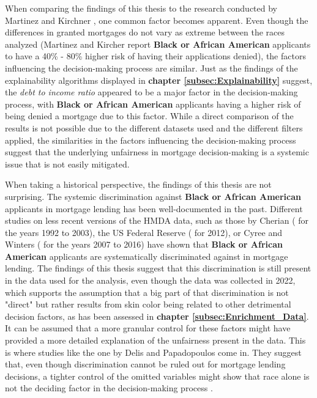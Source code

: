 When comparing the findings of this thesis to the research conducted by Martinez and Kirchner \parencite{Martinez2021}, one common factor becomes apparent. Even though the differences in granted mortgages do not vary as extreme between the races analyzed (Martinez and Kircher report \textbf{Black or African American} applicants to have a 40\% - 80\% higher risk of having their applications denied), the factors influencing the decision-making process are similar.
Just as the findings of the explainability algorithms displayed in \textbf{chapter \ref{subsec:Explainability}} suggest, the \textit{debt to income ratio} appeared to be a major factor in the decision-making process, with \textbf{Black or African American} applicants having a higher risk of being denied a mortgage due to this factor.
While a direct comparison of the results is not possible due to the different datasets used and the different filters applied, the similarities in the factors influencing the decision-making process suggest that the underlying unfairness in mortgage decision-making is a systemic issue that is not easily mitigated.

When taking a historical perspective, the findings of this thesis are not surprising. The systemic discrimination against \textbf{Black or African American} applicants in mortgage lending has been well-documented in the past. 
Different studies on less recent versions of the HMDA data, such as those by Cherian (\cite{Cherian2014} for the years 1992 to 2003), the US Federal Reserve (\cite{Fed2013} for 2012), or Cyree and Winters (\cite{Cyree2023} for the years 2007 to 2016) have shown that \textbf{Black or African American} applicants are systematically discriminated against in mortgage lending.
The findings of this thesis suggest that this discrimination is still present in the data used for the analysis, even though the data was collected in 2022, which supports the assumption that a big part of that discrimination is not "direct" but rather results from skin color being related to other detrimental decision factors, as has been assessed in \textbf{chapter \ref{subsec:Enrichment_Data}}.
It can be assumed that a more granular control for these factors might have provided a more detailed explanation of the unfairness present in the data. This is where studies like the one by Delis and Papadopoulos come in. They suggest that, even though discrimination cannot be ruled out for mortgage lending decisions, a tighter control of the omitted variables might show that race alone is not the deciding factor in the decision-making process \parencite{Delis2019}.

